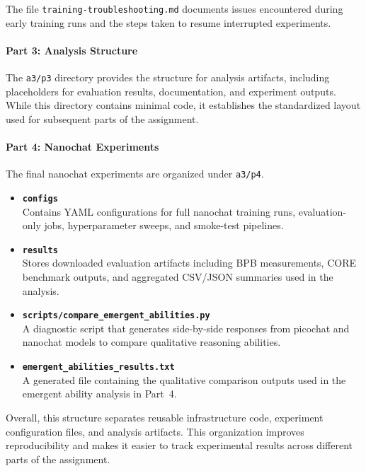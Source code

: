 The file \texttt{training-troubleshooting.md} documents issues encountered
during early training runs and the steps taken to resume interrupted
experiments.

\paragraph{Part 3: Analysis Structure}

The \texttt{a3/p3} directory provides the structure for analysis artifacts,
including placeholders for evaluation results, documentation, and
experiment outputs. While this directory contains minimal code, it
establishes the standardized layout used for subsequent parts of the
assignment.

\paragraph{Part 4: Nanochat Experiments}

The final nanochat experiments are organized under \texttt{a3/p4}.

\begin{itemize}

\item \textbf{\texttt{configs}} \\
Contains YAML configurations for full nanochat training runs, evaluation-only
jobs, hyperparameter sweeps, and smoke-test pipelines.

\item \textbf{\texttt{results}} \\
Stores downloaded evaluation artifacts including BPB measurements,
CORE benchmark outputs, and aggregated CSV/JSON summaries used in the
analysis.

\item \textbf{\texttt{scripts/compare\_emergent\_abilities.py}} \\
A diagnostic script that generates side-by-side responses from picochat
and nanochat models to compare qualitative reasoning abilities.

\item \textbf{\texttt{emergent\_abilities\_results.txt}} \\
A generated file containing the qualitative comparison outputs used in
the emergent ability analysis in Part~4.

\end{itemize}

Overall, this structure separates reusable infrastructure code, experiment
configuration files, and analysis artifacts. This organization improves
reproducibility and makes it easier to track experimental results across
different parts of the assignment.
